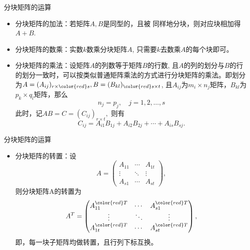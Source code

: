 \begin{frame}

\begin{block}{分块矩阵的运算}
\begin{itemize}
\item 分块矩阵的加法：若矩阵$A,B$是同型的，且被{\color{red} 同样地分块}，则{\color{red}对应块相加}得$A+B$.
\item 分块矩阵的数乘：实数$k$数乘分块矩阵$A$, 只需要$k$去数乘$A$的每个块即可。
\item 分块矩阵的乘法：设矩阵$A$的列数等于矩阵$B$的行数, 且$A$的列的划分与$B$的行的划分一致时，可以按类似普通矩阵乘法的方式进行分块矩阵的乘法。即划分为$A = (A_{ij})_{r\times {\color{red}s}}, B = (B_{kl})_{{\color{red}s}\times t}$, 且$A_{ij}$为$m_i\times n_j$矩阵，$B_{kl}$为$p_k\times q_l$矩阵，那么
$$n_j = p_j, \quad j = 1, 2, \ldots, s$$
此时，记$AB = C = (C_{ij})_{r\times t},$ 则有
$$C_{ij} = A_{i1}B_{1j} + A_{i2}B_{2j} + \cdots + A_{is}B_{sj}.$$
\end{itemize}
\end{block}

\end{frame}


\begin{frame}

\begin{block}{分块矩阵的运算}
\begin{itemize}
\item 分块矩阵的转置：设
$$A = \begin{pmatrix}
A_{11} & \cdots & A_{1t} \\
\vdots & \ddots & \vdots \\
A_{s1} & \cdots & A_{st}
\end{pmatrix},$$
则分块矩阵A的转置为
$$A^T = \begin{pmatrix}
A_{11}^{{\color{red}T}} & \cdots & A_{s1}^{{\color{red}T}} \\
\vdots & \ddots & \vdots \\
A_{1t}^{{\color{red}T}} & \cdots & A_{st}^{{\color{red}T}}
\end{pmatrix},$$
即，每一块子矩阵均做转置，且行列下标互换。
\end{itemize}
\end{block}

\end{frame}


